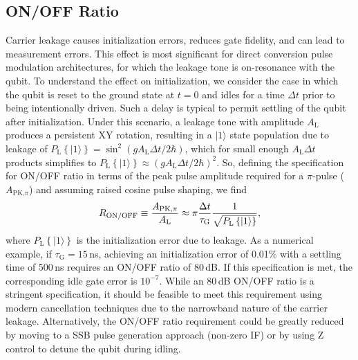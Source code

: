 \documentclass[journal]{IEEEtran}
\newcommand{\CR}[1]{{\color{black}#1}}
\begin{document}
\subsection{ON/OFF Ratio}
\label{ONOFF}
\CR{Carrier leakage causes initialization errors, reduces gate fidelity, and can lead to measurement errors.} This effect is most significant for direct conversion pulse modulation architectures, for which the leakage tone is on-resonance with the qubit. %
To understand the effect on initialization, we consider the case in which the qubit is reset to the ground state at $t=0$ and idles for a time $\Delta{t}$ prior to being intentionally driven. Such a delay is typical to permit settling of the qubit after initialization. Under this scenario, a leakage tone with amplitude $A_\text{L}$ produces a persistent XY rotation, resulting in a $|1\rangle$ state population due to leakage of $P_\text{L}\left\{|1\rangle\right\}=\sin^2\left(gA_\text{L}\Delta{t}/2\hbar\right)$, which for small enough $A_\text{L}\Delta{t}$ products simplifies to $P_\text{L}\left\{|1\rangle\right\}\approx{}\left(gA_\text{L}\Delta{t}/2\hbar\right)^2$. So, defining the specification for ON/OFF ratio in terms of the peak pulse amplitude required for a $\pi$-pulse ($A_{\text{PK,}\pi}$) and assuming raised cosine pulse shaping, we find
\begin{equation}
R_\text{ON/OFF}\equiv{}\frac{A_{\text{PK},\pi}}{A_\text{L}}\approx{\pi}\frac{\Delta{}t}{\CR{\tau_\text{G}}}\frac{1}{\sqrt{P_\text{L}\left\{|1\rangle\right\}}},\label{ONOFFratio}
\end{equation}
where $P_\text{L}\left\{|1\rangle\right\}$ is the initialization error due to leakage. As a numerical example, if \CR{$\tau_\text{G}=15\,$}ns, achieving an initialization error of 0.01\% with a settling time of 500\,ns requires an ON/OFF ratio of 
80\,dB. \CR{If this specification is met, the corresponding idle gate  error is $10^{-7}$. While an 80\,dB ON/OFF ratio is a stringent specification,} it should be feasible to meet this requirement using modern cancellation techniques due to the narrowband nature of the carrier leakage. \CR{Alternatively, the ON/OFF ratio requirement could be greatly reduced by moving to a SSB pulse generation approach (non-zero IF) or by using Z control to detune the qubit during idling.}
\end{document}
